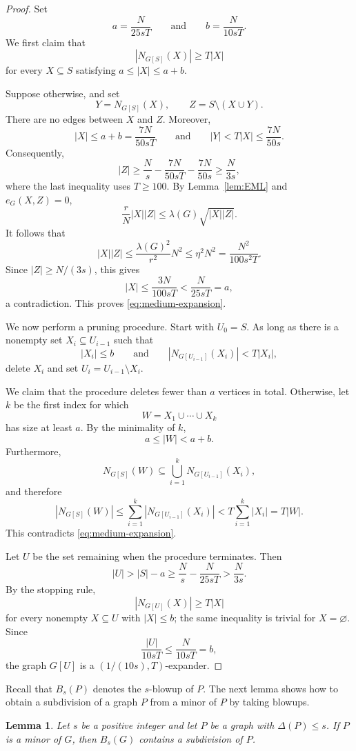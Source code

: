 \documentclass[11pt]{article}
\newtheorem{lemma}[theorem]{Lemma}
\theoremstyle{definition}
\begin{document}
\begin{proof}
Set
\[
a=\frac{N}{25sT}
\qquad\text{and}\qquad
b=\frac{N}{10sT}.
\]
We first claim that
\begin{equation}\label{eq:medium-expansion}
|N_{G[S]}(X)|\ge T|X|
\end{equation}
for every $X\subseteq S$ satisfying $a\le |X|\le a+b$.

Suppose otherwise, and set
\[
Y=N_{G[S]}(X),
\qquad
Z=S\setminus(X\cup Y).
\]
There are no edges between $X$ and $Z$. Moreover,
\[
|X|\le a+b=\frac{7N}{50sT}
\qquad\text{and}\qquad
|Y|<T|X|\le\frac{7N}{50s}.
\]
Consequently,
\[
|Z|\ge \frac{N}{s}-\frac{7N}{50sT}-\frac{7N}{50s}
     \ge \frac{N}{3s},
\]
where the last inequality uses $T\ge100$. By
Lemma~\ref{lem:EML} and $e_G(X,Z)=0$,
\[
\frac{r}{N}|X||Z|
 \le \lambda(G)\sqrt{|X||Z|}.
\]
It follows that
\[
|X||Z|
 \le \frac{\lambda(G)^2}{r^2}N^2
 \le \eta^2N^2
 =\frac{N^2}{100s^2T}.
\]
Since $|Z|\ge N/(3s)$, this gives
\[
|X|\le\frac{3N}{100sT}<\frac{N}{25sT}=a,
\]
a contradiction. This proves \eqref{eq:medium-expansion}.

We now perform a pruning procedure. Start with $U_0=S$. As long as there
is a nonempty set $X_i\subseteq U_{i-1}$ such that
\[
|X_i|\le b
\qquad\text{and}\qquad
|N_{G[U_{i-1}]}(X_i)|<T|X_i|,
\]
delete $X_i$ and set $U_i=U_{i-1}\setminus X_i$.

We claim that the procedure deletes fewer than $a$ vertices in total.
Otherwise, let $k$ be the first index for which
\[
W=X_1\cup\cdots\cup X_k
\]
has size at least $a$. By the minimality of $k$,
\[
a\le |W|<a+b.
\]
Furthermore,
\[
N_{G[S]}(W)
 \subseteq \bigcup_{i=1}^k N_{G[U_{i-1}]}(X_i),
\]
and therefore
\[
|N_{G[S]}(W)|
 \le \sum_{i=1}^k |N_{G[U_{i-1}]}(X_i)|
 < T\sum_{i=1}^k|X_i|
 =T|W|.
\]
This contradicts \eqref{eq:medium-expansion}.

Let $U$ be the set remaining when the procedure terminates. Then
\[
|U|>|S|-a
 \ge\frac{N}{s}-\frac{N}{25sT}
 >\frac{N}{3s}.
\]
By the stopping rule,
\[
|N_{G[U]}(X)|\ge T|X|
\]
for every nonempty $X\subseteq U$ with $|X|\le b$; the same inequality is
trivial for $X=\varnothing$. Since
\[
\frac{|U|}{10sT}\le\frac{N}{10sT}=b,
\]
the graph $G[U]$ is a $(1/(10s),T)$-expander.
\end{proof}

Recall that $B_s(P)$ denotes the $s$-blowup of $P$. The next lemma shows how to obtain a subdivision of a graph $P$ from a minor of $P$ by taking blowups.

\begin{lemma}\label{lem:lift}
Let $s$ be a positive integer and let $P$ be a graph with
$\Delta(P)\le s$. If $P$ is a minor of $G$, then $B_s(G)$ contains a
subdivision of $P$.
\end{lemma}
\end{document}
